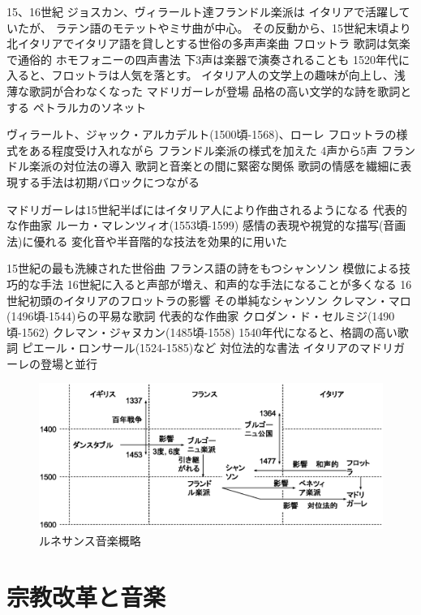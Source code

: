 \documentclass[a4j]{jarticle}
\begin{document}
15、16世紀
ジョスカン、ヴィラールト達フランドル楽派は
イタリアで活躍していたが、
ラテン語のモテットやミサ曲が中心。
その反動から、15世紀末頃より
北イタリアでイタリア語を貸しとする世俗の多声声楽曲
フロットラ
歌詞は気楽で通俗的
ホモフォニーの四声書法
下3声は楽器で演奏されることも
1520年代に入ると、フロットラは人気を落とす。
イタリア人の文学上の趣味が向上し、浅薄な歌詞が合わなくなった
マドリガーレが登場
品格の高い文学的な詩を歌詞とする
ペトラルカのソネット

ヴィラールト、ジャック・アルカデルト(1500頃-1568)、ローレ
フロットラの様式をある程度受け入れながら
フランドル楽派の様式を加えた
4声から5声
フランドル楽派の対位法の導入
歌詞と音楽との間に緊密な関係
歌詞の情感を繊細に表現する手法は初期バロックにつながる

マドリガーレは15世紀半ばにはイタリア人により作曲されるようになる
代表的な作曲家
ルーカ・マレンツィオ(1553頃-1599)
感情の表現や視覚的な描写(音画法)に優れる
変化音や半音階的な技法を効果的に用いた

15世紀の最も洗練された世俗曲
フランス語の詩をもつシャンソン
模倣による技巧的な手法
16世紀に入ると声部が増え、和声的な手法になることが多くなる
16世紀初頭のイタリアのフロットラの影響
その単純なシャンソン
クレマン・マロ(1496頃-1544)らの平易な歌詞
代表的な作曲家
クロダン・ド・セルミジ(1490頃-1562)
クレマン・ジャヌカン(1485頃-1558)
1540年代になると、格調の高い歌詞
ピエール・ロンサール(1524-1585)など
対位法的な書法
イタリアのマドリガーレの登場と並行

\begin{figure}[tb]
 \begin{center}
  \includegraphics[width=\hsize]{fig/renaissance_summary.eps}
  \caption{ルネサンス音楽概略}
  \label{fig:renaissance_summary}
 \end{center}
\end{figure}

\section{宗教改革と音楽}
\end{document}
